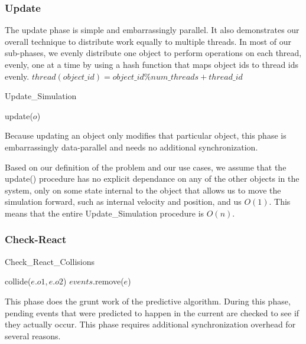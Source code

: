\documentclass[conference]{IEEEtran}
\begin{document}
\subsubsection{Update}
\label{sub:update}
The update phase is simple and embarrassingly parallel.  It also demonstrates our overall technique to distribute work equally to multiple threads.  In most of our sub-phases,
we evenly distribute one object to perform operations on each thread, evenly, one at a time by using a hash function that maps object ids to thread ids evenly. $thread(object\_id) = object\_id \% num\_threads + thread\_id$
\begin{algorithm}
\caption{Update\_Simulation}
\begin{algorithmic}
	\STATE update($o$)
\ENDFOR
\end{algorithmic}
\end{algorithm}

Because updating an object only modifies that particular object, this phase is embarrassingly data-parallel and needs no additional synchronization.

Based on our definition of the problem and our use cases, we assume that the update() procedure has no explicit dependance on any of the other objects
in the system, only on some state internal to the object that allows us to move the simulation forward, such as internal velocity and position, and us $O(1)$.  This means
that the entire Update\_Simulation procedure is $O(n)$.
\subsubsection{Check-React}
\label{sub:checkreact}
\begin{algorithm}
\caption{Check\_React\_Collisions}
\begin{algorithmic}
\STATE {}
	\STATE {}
		\STATE {}
		\STATE collide($e.o1,e.o2$)
	\ENDIF
	\STATE {}
	\STATE $events$.remove($e$)
\ENDFOR
\end{algorithmic}
\end{algorithm}
This phase does the grunt work of the predictive algorithm.  During this phase, pending events that were predicted to happen in the current  are checked to see if they actually occur.  This phase requires additional synchronization overhead for several reasons.
\end{document}
